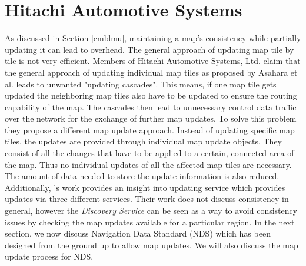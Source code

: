 \section{Hitachi Automotive Systems}
As discussed in Section \ref{cmldmu}, maintaining a map's consistency while partially updating it can lead to overhead. The general approach of updating map tile by tile is not very efficient. Members of Hitachi Automotive Systems, Ltd. \cite{hitachi} claim that the general approach of updating individual map tiles as proposed by Asahara et al. leads to unwanted "updating cascades". This means, if one map tile gets updated the neighboring map tiles also have to be updated to ensure the routing capability of the map. The cascades then lead to unnecessary control data traffic over the network for the exchange of further map updates. To solve this problem they propose a different map update approach. Instead of updating specific map tiles, the updates are provided through individual map update objects. They consist of all the changes that have to be applied to a certain, connected area of the map. Thus no individual updates of all the affected map tiles are necessary. The amount of data needed to store the update information is also reduced. \\

Additionally, \citet{min2011system}'s work provides an insight into updating service which provides updates via three different services. Their work does not discuss consistency in general, however the \textit{Discovery Service} can be seen as a way to avoid consistency issues by checking the map updates available for a particular region. In the next section, we now discuss Navigation Data Standard (NDS) which has been designed from the ground up to allow map updates. We will also discuss the map update process for NDS.



